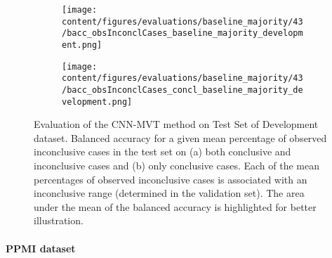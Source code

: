 \begin{figure}[ht]
  \begin{subfigure}{0.5\textwidth}
    \centering
    \texttt{[image: content/figures/evaluations/baseline\_majority/43/bacc\_obsInconclCases\_baseline\_majority\_development.png]}
    \subcaption{}
    \label{fig:bacc_obsInconclCases_baseline_majority_development}
  \end{subfigure}
  \hfill
  \begin{subfigure}{0.5\textwidth}
    \centering
    \texttt{[image: content/figures/evaluations/baseline\_majority/43/bacc\_obsInconclCases\_concl\_baseline\_majority\_development.png]}
    \subcaption{}
    \label{fig:bacc_obsInconclCases_concl_baseline_majority_development}
  \end{subfigure}

  \caption{Evaluation of the CNN-MVT method on Test Set of Development dataset.
  Balanced accuracy for a given mean percentage of observed inconclusive cases in the test set on 
  (a) both conclusive and inconclusive cases and (b) only conclusive cases. 
  Each of the mean percentages of observed inconclusive cases is associated with an inconclusive range (determined in the validation set). 
  The area under the mean of the balanced accuracy is highlighted for better illustration.}
  \label{fig:bacc_obsInconclCases_baseline_majority_development_full}
\end{figure}




\paragraph{PPMI dataset}

